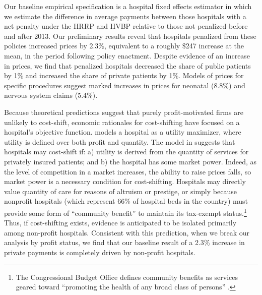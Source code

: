 \documentclass[12pt]{article}
\begin{document}
Our baseline empirical specification is a hospital fixed effects estimator in which we estimate the difference in average payments between those hospitals with a net penalty under the HRRP and HVBP relative to those not penalized before and after 2013.  Our preliminary results reveal that hospitals penalized from these policies increased prices by 2.3$\%$, equivalent to a roughly $\$$247 increase at the mean, in the period following policy enactment.  Despite evidence of an increase in prices, we find that penalized hospitals decreased the share of public patients by 1$\%$ and increased the share of private patients by 1$\%$.  Models of prices for specific procedures suggest marked increases in prices for neonatal (8.8$\%$) and nervous system claims (5.4$\%$).

Because theoretical predictions suggest that purely profit-motivated firms are unlikely to cost-shift, economic rationales for cost-shifting have focused on a hospital's objective function.  \cite{dranove1988} models a hospital as a utility maximizer, where utility is defined over both profit and quantity. The model in \cite{dranove1988} suggests that hospitals may cost-shift if: a) utility is derived from the quantity of services for privately insured patients; and b) the hospital has some market power. Indeed, as the level of competition in a market increases, the ability to raise prices falls, so market power is a necessary condition for cost-shifting. Hospitals may directly value quantity of care for reasons of altruism or prestige, or simply because nonprofit hospitals (which represent 66\% of hospital beds in the country) must provide some form of ``community benefit'' to maintain its tax-exempt status.\footnote{The Congressional Budget Office defines community benefits as services geared toward ``promoting the health of any broad class of persons'' \citep{cbo2006}.} Thus, if cost-shifting exists, evidence is anticipated to be isolated primarily among non-profit hospitals. Consistent with this prediction, when we break our analysis by profit status, we find that our baseline result of a 2.3$\%$ increase in private payments is completely driven by non-profit hospitals.
\end{document}

